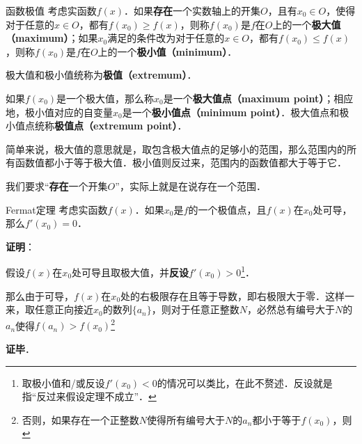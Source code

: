 

\begin{definition}{函数极值}
考虑实函数$f(x)$．如果\textbf{存在}一个实数轴上的开集$O$，且有$x_0\in O$，使得对于任意的$x\in O$，都有$f(x_0)\geq f(x)$，则称$f(x_0)$是$f$在$O$上的一个\textbf{极大值（maximum）}；如果$x_0$满足的条件改为对于任意的$x\in O$，都有$f(x_0)\leq f(x)$，则称$f(x_0)$是$f$在$O$上的一个\textbf{极小值（minimum）}．

极大值和极小值统称为\textbf{极值（extremum）}．

如果$f(x_0)$是一个极大值，那么称$x_0$是一个\textbf{极大值点（maximum point）}；相应地，极小值对应的自变量$x_0$是一个\textbf{极小值点（minimum point）}．极大值点和极小值点统称\textbf{极值点（extremum point）}．
\end{definition}


简单来说，极大值的意思就是，取包含极大值点的足够小的范围，那么范围内的所有函数值都小于等于极大值．极小值则反过来，范围内的函数值都大于等于它．

我们要求“\textbf{存在}一个开集$O$”，实际上就是在说存在一个范围．


\begin{theorem}{Fermat定理}
考虑实函数$f(x)$．如果$x_0$是$f$的一个极值点，且$f(x)$在$x_0$处可导，那么$f'(x_0)=0$．
\end{theorem}

\textbf{证明}：

假设$f(x)$在$x_0$处可导且取极大值，并\textbf{反设}$f'(x_0)>0$\footnote{取极小值和/或反设$f'(x_0)<0$的情况可以类比，在此不赘述．反设就是指“反过来假设定理不成立”．}．

那么由于可导，$f(x)$在$x_0$处的右极限存在且等于导数，即右极限大于零．这样一来，取任意正向接近$x_0$的数列$\{a_n\}$，则对于任意正整数$N$，必然总有编号大于$N$的$a_n$使得$f(a_n)>f(x_0)$\footnote{否则，如果存在一个正整数$N$使得所有编号大于$N$的$a_n$都小于等于$f(x_0)$，则$$}

\textbf{证毕}．











